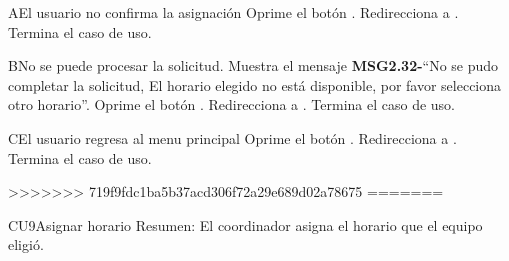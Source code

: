 \begin{UCtrayectoriaA}{A}{El usuario no confirma la asignación}
	\UCpaso[\UCactor] Oprime el botón .
	\UCpaso Redirecciona a .
	\UCpaso Termina el caso de uso.
	\end{UCtrayectoriaA}

\begin{UCtrayectoriaA}{B}{No se puede procesar la solicitud.}
	\UCpaso Muestra el mensaje {\bf MSG2.32-}``No se pudo completar la solicitud, El horario elegido no está disponible, por favor selecciona otro horario''.
	\UCpaso[\UCactor] Oprime el botón .
	\UCpaso Redirecciona a .
	\UCpaso Termina el caso de uso.
	\end{UCtrayectoriaA}
		
\begin{UCtrayectoriaA}{C}{El usuario regresa al menu principal}
	\UCpaso[\UCactor] Oprime el botón .
	\UCpaso Redirecciona a .
	\UCpaso Termina el caso de uso.
	\end{UCtrayectoriaA}
	
>>>>>>> 719f9fdc1ba5b37acd306f72a29e689d02a78675
=======



	\begin{UseCase}{CU9}{Asignar horario}{
		Resumen: El coordinador asigna el horario que el equipo eligió.}
		
	\end{UseCase}
	\newpage
	
